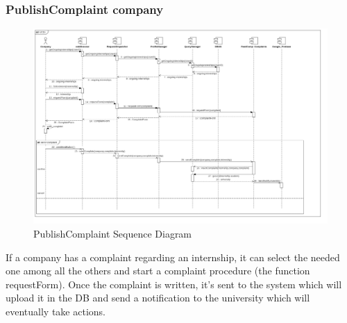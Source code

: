 \documentclass{article}
\begin{document}
\subsubsection{PublishComplaint company}
\begin{figure}[H]
    \centering
    \includegraphics[width=1\linewidth]{SequenceDiagram/UC15.jpg}
    \caption{PublishComplaint  Sequence Diagram}
    \label{fig:enter-label}
\end{figure}
If a company has a complaint regarding an internship, it can select the needed one among all the others and start a complaint procedure (the function requestForm). Once the complaint is written, it's sent to the system which will upload it in the DB and send a notification to the university which will eventually take actions. 
\end{document}
